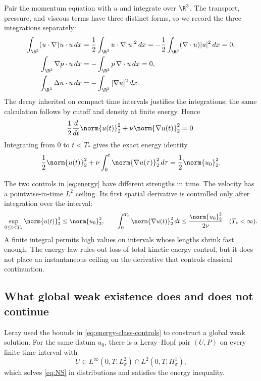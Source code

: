 Pair the momentum equation with \(u\) and integrate over \(\R^3\).  The
transport, pressure, and viscous terms have three distinct forms, so we record
the three integrations separately:
\begin{align*}
 \int_{\R^3}(u\cdot\nabla)u\cdot u\,dx
 &=\frac12\int_{\R^3}u\cdot\nabla|u|^2\,dx
 =-\frac12\int_{\R^3}(\nabla\cdot u)|u|^2\,dx=0,\\
 \int_{\R^3}\nabla p\cdot u\,dx
 &=-\int_{\R^3}p\,\nabla\cdot u\,dx=0,\\
 \int_{\R^3}\Delta u\cdot u\,dx
 &=-\int_{\R^3}|\nabla u|^2\,dx.
\end{align*}
The decay inherited on compact time intervals justifies the integrations;
the same calculation follows by cutoff and density at finite energy.  Hence
\begin{equation*}
 \frac12\frac d{dt}\norm{u(t)}_2^2
 +\nu\norm{\nabla u(t)}_2^2=0.
\end{equation*}
Integrating from \(0\) to \(t<T_*\) gives the exact energy identity
\begin{equation}
 \frac12\norm{u(t)}_2^2
 +\nu\int_0^t\norm{\nabla u(\tau)}_2^2\,d\tau
 =\frac12\norm{u_0}_2^2.
 \label{eq:energy}
\end{equation}

The two controls in \eqref{eq:energy} have different strengths in time.  The
velocity has a pointwise-in-time \(L^2\) ceiling.  Its first spatial derivative
is controlled only after integration over the interval:
\begin{equation}
 \sup_{0\le t<T_*}\norm{u(t)}_2^2\le\norm{u_0}_2^2,
 \qquad
 \int_0^{T_*}\norm{\nabla u(t)}_2^2\,dt
 \le\frac{\norm{u_0}_2^2}{2\nu}
 \quad(T_*<\infty).
 \label{eq:energy-class-controls}
\end{equation}
A finite integral permits high values on intervals whose lengths shrink fast
enough.  The energy law rules out loss of total kinetic energy control, but it
does not place an instantaneous ceiling on the derivative that controls
classical continuation.

\subsection{What global weak existence does and does not continue}

Leray used the bounds in \eqref{eq:energy-class-controls} to construct a
global weak solution.  For the same datum \(u_0\), there is a Leray--Hopf pair
\((U,P)\) on every finite time interval with
\begin{equation*}
 U\in L^\infty(0,T;L^2_\sigma)
    \cap L^2(0,T;H^1_\sigma),
\end{equation*}
which solves \eqref{eq:NS} in distributions and satisfies the energy
inequality.

